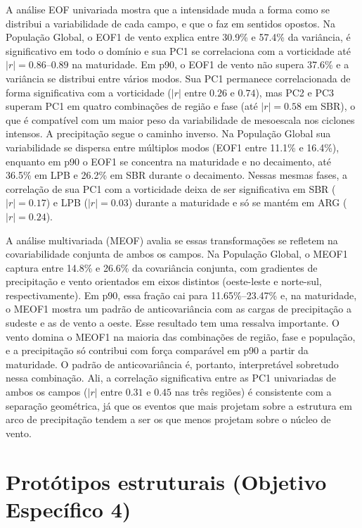 A análise EOF univariada mostra que a intensidade muda a forma como se distribui a variabilidade de cada campo, e que o faz em sentidos opostos. Na População Global, o EOF1 de vento explica entre 30.9\% e 57.4\% da variância, é significativo em todo o domínio e sua PC1 se correlaciona com a vorticidade até $|r|=0.86$--$0.89$ na maturidade. Em p90, o EOF1 de vento não supera 37.6\% e a variância se distribui entre vários modos. Sua PC1 permanece correlacionada de forma significativa com a vorticidade ($|r|$ entre $0.26$ e $0.74$), mas PC2 e PC3 superam PC1 em quatro combinações de região e fase (até $|r|=0.58$ em SBR), o que é compatível com um maior peso da variabilidade de mesoescala nos ciclones intensos. A precipitação segue o caminho inverso. Na População Global sua variabilidade se dispersa entre múltiplos modos (EOF1 entre 11.1\% e 16.4\%), enquanto em p90 o EOF1 se concentra na maturidade e no decaimento, até 36.5\% em LPB e 26.2\% em SBR durante o decaimento. Nessas mesmas fases, a correlação de sua PC1 com a vorticidade deixa de ser significativa em SBR ($|r|=0.17$) e LPB ($|r|=0.03$) durante a maturidade e só se mantém em ARG ($|r|=0.24$).

A análise multivariada (MEOF) avalia se essas transformações se refletem na covariabilidade conjunta de ambos os campos. Na População Global, o MEOF1 captura entre 14.8\% e 26.6\% da covariância conjunta, com gradientes de precipitação e vento orientados em eixos distintos (oeste-leste e norte-sul, respectivamente). Em p90, essa fração cai para 11.65\%--23.47\% e, na maturidade, o MEOF1 mostra um padrão de anticovariância com as cargas de precipitação a sudeste e as de vento a oeste. Esse resultado tem uma ressalva importante. O vento domina o MEOF1 na maioria das combinações de região, fase e população, e a precipitação só contribui com força comparável em p90 a partir da maturidade. O padrão de anticovariância é, portanto, interpretável sobretudo nessa combinação. Ali, a correlação significativa entre as PC1 univariadas de ambos os campos ($|r|$ entre $0.31$ e $0.45$ nas três regiões) é consistente com a separação geométrica, já que os eventos que mais projetam sobre a estrutura em arco de precipitação tendem a ser os que menos projetam sobre o núcleo de vento.

\section{Protótipos estruturais (Objetivo Específico 4)}

